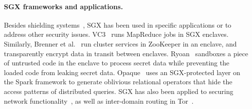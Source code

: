 \paragraph{SGX frameworks and applications.}
Besides shielding systems~\cite{baumann14haven,osdi16scone,shinde17panoply},
SGX has been used in specific applications or to address other security issues.
VC3~\cite{vc3} runs MapReduce jobs in SGX enclaves.
Similarly, Brenner et al.~\cite{zookeeper}
run cluster services in ZooKeeper in an enclave, and transparently encrypt data in transit between enclaves.
Ryoan~\cite{hunt16ryoan} sandboxes a piece of untrusted code in the enclave
to process secret data while preventing the loaded code from leaking secret data.
Opaque~\cite{zheng2017opaque} uses an SGX-protected layer on the Spark framework to generate oblivious relational operators that hide the access patterns of distributed queries.
SGX has also been applied to securing network functionality~\cite{shih2016s},
as well as inter-domain routing in Tor~\cite{kim2015first}.

